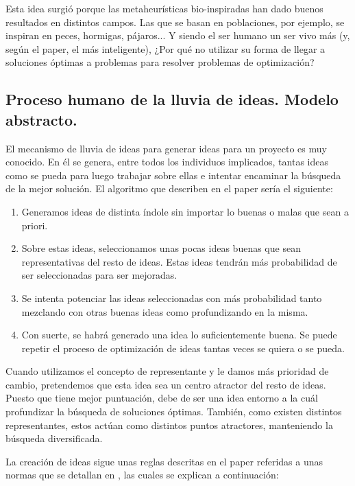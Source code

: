 Esta idea surgió porque las metaheurísticas bio-inspiradas han dado buenos resultados en distintos campos. Las que se basan en poblaciones, por ejemplo, se inspiran en peces, hormigas, pájaros... Y siendo el ser humano un ser vivo más (y, según el paper, el más inteligente), ¿Por qué no utilizar su forma de llegar a soluciones óptimas a problemas para resolver problemas de optimización?\\

\subsection{Proceso humano de la lluvia de ideas. Modelo abstracto.}

El mecanismo de lluvia de ideas para generar ideas para un proyecto es muy conocido. En él se genera, entre todos los individuos implicados, tantas ideas como se pueda para luego trabajar sobre ellas e intentar encaminar la búsqueda de la mejor solución. El algoritmo que describen en el paper sería el siguiente:\\

\begin{enumerate}
	\item Generamos ideas de distinta índole sin importar lo buenas o malas que sean a priori.
	\item Sobre estas ideas, seleccionamos unas pocas ideas buenas que sean representativas del resto de ideas. Estas ideas tendrán más probabilidad de ser seleccionadas para ser mejoradas.
	\item Se intenta potenciar las ideas seleccionadas con más probabilidad tanto mezclando con otras buenas ideas como profundizando en la misma.
	\item Con suerte, se habrá generado una idea lo suficientemente buena. Se puede repetir el proceso de optimización de ideas tantas veces se quiera o se pueda.
\end{enumerate}

Cuando utilizamos el concepto de representante y le damos más prioridad de cambio, pretendemos que esta idea sea un centro atractor del resto de ideas. Puesto que tiene mejor puntuación, debe de ser una idea entorno a la cuál profundizar la búsqueda de soluciones óptimas. También, como existen distintos representantes, estos actúan como distintos puntos atractores, manteniendo la búsqueda diversificada.


La creación de ideas sigue unas reglas descritas en el paper referidas a unas normas que se detallan en \cite{smith}, las cuales se explican a continuación: 

